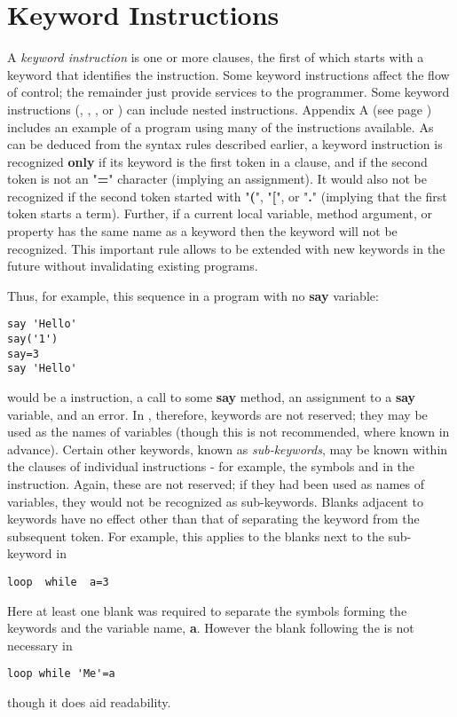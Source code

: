 \chapter{Keyword Instructions}\label{refkinst}
 A \emph{keyword instruction} is one or more clauses, the first of
which starts with a keyword that identifies the instruction.
Some keyword instructions affect the flow of control; the remainder
just provide services to the programmer.
Some keyword instructions (, , , or
) can include nested instructions.
 Appendix A (see page \pageref{refappa})  includes an example of a \nr{} program
using many of the instructions available.
 As can be deduced from the syntax rules described earlier, a keyword
instruction is recognized \textbf{only} if its keyword is the first
token in a clause, and if the second token is not an "\textbf{=}"
character (implying an assignment).
It would also not be recognized if the second token started
with "\textbf{(}", "\textbf{[}",
or "\textbf{.}" (implying that the first token starts a term).
 Further, if a current local variable, method argument, or property
has the same name as a keyword then the keyword will not be recognized.
This important rule allows \nr{} to be extended with new keywords in
the future without invalidating existing programs.
 
Thus, for example, this sequence in a program with no \textbf{say}
variable:
\begin{lstlisting}
say 'Hello'
say('1')
say=3
say 'Hello'
\end{lstlisting}
would be a  instruction, a call to some \textbf{say}
method, an assignment to a \textbf{say} variable, and an error.
 In \nr{}, therefore, keywords are not reserved; they may be used as
the names of variables (though this is not recommended, where known in
advance).
 Certain other keywords, known as \emph{sub-keywords}, may be
known within the clauses of individual instructions - for
example, the symbols  and  in the 
instruction.  Again, these are not reserved; if they had been used as
names of variables, they would not be recognized as sub-keywords.
 Blanks adjacent to keywords have no effect other than that of
separating the keyword from the subsequent token.
For example, this applies to the blanks next to the sub-keyword
 in
\begin{lstlisting}
loop  while  a=3
\end{lstlisting}
Here at least one blank was required to separate the symbols
forming the keywords and the variable name, \textbf{a}.  However the
blank following the  is not necessary in
\begin{lstlisting}
loop while 'Me'=a
\end{lstlisting}
though it does aid readability.
